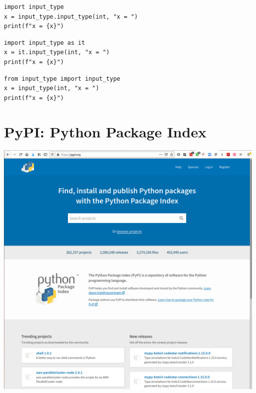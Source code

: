 \begin{frame}[fragile]
  \begin{example}
    \begin{verbatim}
import input_type
x = input_type.input_type(int, "x = ")
print(f"x = {x}")
    \end{verbatim}
  \end{example}

  \begin{example}
    \begin{verbatim}
import input_type as it
x = it.input_type(int, "x = ")
print(f"x = {x}")
    \end{verbatim}
  \end{example}

  \begin{example}
    \begin{verbatim}
from input_type import input_type
x = input_type(int, "x = ")
print(f"x = {x}")
    \end{verbatim}
  \end{example}
\end{frame}


\section{PyPI: Python Package Index}

\begin{frame}
  \includegraphics[width=\columnwidth]{figs/pypi.png}
\end{frame}

